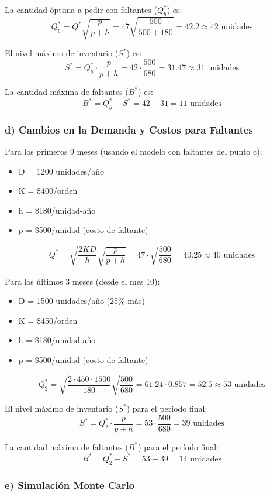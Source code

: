 \documentclass[12pt]{article}
\begin{document}
La cantidad óptima a pedir con faltantes ($Q_b^*$) es:
\[
Q_b^* = Q^* \sqrt{\frac{p}{p+h}} = 47 \sqrt{\frac{500}{500+180}} = 42.2 \approx 42 \text{ unidades}
\]

El nivel máximo de inventario ($S^*$) es:
\[
S^* = Q_b^* \cdot \frac{p}{p+h} = 42 \cdot \frac{500}{680} = 31.47 \approx 31 \text{ unidades}
\]

La cantidad máxima de faltantes ($B^*$) es:
\[
B^* = Q_b^* - S^* = 42 - 31 = 11 \text{ unidades}
\]

\subsubsection{d) Cambios en la Demanda y Costos para Faltantes}

Para los primeros 9 meses (usando el modelo con faltantes del punto c):
\begin{itemize}
    \item D = 1200 unidades/año
    \item K = \$400/orden
    \item h = \$180/unidad-año
    \item p = \$500/unidad (costo de faltante)
\end{itemize}

\[
Q_1^* = \sqrt{\frac{2KD}{h}} \sqrt{\frac{p}{p+h}} = 47 \cdot \sqrt{\frac{500}{680}} = 40.25 \approx 40 \text{ unidades}
\]

Para los últimos 3 meses (desde el mes 10):
\begin{itemize}
    \item D = 1500 unidades/año (25\% más)
    \item K = \$450/orden
    \item h = \$180/unidad-año
    \item p = \$500/unidad (costo de faltante)
\end{itemize}

\[
Q_2^* = \sqrt{\frac{2 \cdot 450 \cdot 1500}{180}} \sqrt{\frac{500}{680}} = 61.24 \cdot 0.857 = 52.5 \approx 53 \text{ unidades}
\]

El nivel máximo de inventario ($S^*$) para el período final:
\[
S^* = Q_2^* \cdot \frac{p}{p+h} = 53 \cdot \frac{500}{680} = 39 \text{ unidades}
\]

La cantidad máxima de faltantes ($B^*$) para el período final:
\[
B^* = Q_2^* - S^* = 53 - 39 = 14 \text{ unidades}
\]

\subsubsection{e) Simulación Monte Carlo}
\end{document}
